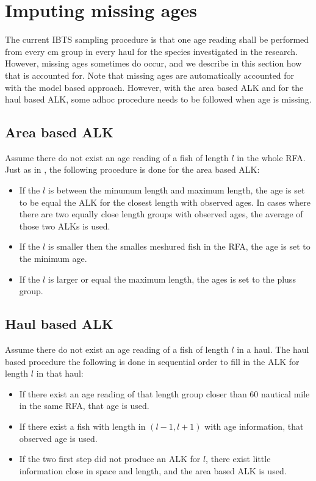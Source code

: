 \documentclass[a4paper 12pt]{article}
\numberwithin{equation}{section}
\begin{document}
\section{\large Imputing missing ages}
\label{sec:imputationappendix}
The current IBTS sampling procedure is that one age reading shall be performed from every cm group in every haul for the species investigated in the research. However, missing ages sometimes do occur, and we describe in this section how that is accounted for. Note that missing ages are automatically accounted for with the model based approach. However, with the area based ALK and for the haul based ALK, some adhoc procedure needs to be followed when age is missing.


\subsection{\normalsize Area based ALK}
\label{secAp:DATRASBorrow}
Assume there do not exist an age reading of a fish of length $l$ in the whole RFA. Just as in \citep{ICES2013}, the following procedure is done for the area based ALK:
\begin{itemize}
\item If the $l$ is between the minumum length and maximum length, the age is set to be equal the ALK for the closest length with observed ages. In cases where there are two equally close length groups with observed ages, the average of those two ALKs is used. 
\item If the $l$ is smaller then the smalles meshured fish in the RFA, the age is set to the minimum age.
\item If the $l$ is larger or equal the maximum length, the ages is set to the pluss group.
\end{itemize}


\subsection{\normalsize Haul based ALK}
\label{secAp:oursBorrow}
Assume there do not exist an age reading of a fish of length $l$ in a haul. The haul based procedure the following is done in sequential order to fill in the ALK for length $l$ in that haul:
\begin{itemize}
\item If there exist an age reading of that length group closer than 60 nautical mile in the same RFA, that age is used.
\item If there exist a fish with length in $(l-1,l+1)$ with age information, that observed age is used.  
\item If the two first step did not produce an ALK for $l$, there exist little information close in space and length, and the area based ALK is used.
\end{itemize}
\end{document}
